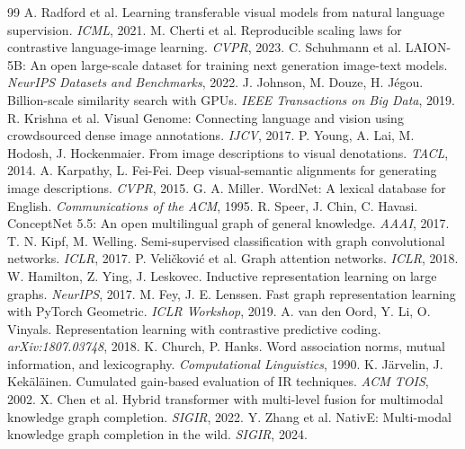 \documentclass[12pt, a4paper]{article}
\begin{document}
\renewcommand{\refname}{Tài liệu tham khảo}
\begin{thebibliography}{99}\small
{} A. Radford et al. Learning transferable visual models from natural language supervision. \textit{ICML}, 2021.
 M. Cherti et al. Reproducible scaling laws for contrastive language-image learning. \textit{CVPR}, 2023.
 C. Schuhmann et al. LAION-5B: An open large-scale dataset for training next generation image-text models. \textit{NeurIPS Datasets and Benchmarks}, 2022.
 J. Johnson, M. Douze, H. Jégou. Billion-scale similarity search with GPUs. \textit{IEEE Transactions on Big Data}, 2019.
 R. Krishna et al. Visual Genome: Connecting language and vision using crowdsourced dense image annotations. \textit{IJCV}, 2017.
 P. Young, A. Lai, M. Hodosh, J. Hockenmaier. From image descriptions to visual denotations. \textit{TACL}, 2014.
 A. Karpathy, L. Fei-Fei. Deep visual-semantic alignments for generating image descriptions. \textit{CVPR}, 2015.
 G. A. Miller. WordNet: A lexical database for English. \textit{Communications of the ACM}, 1995.
 R. Speer, J. Chin, C. Havasi. ConceptNet 5.5: An open multilingual graph of general knowledge. \textit{AAAI}, 2017.
 T. N. Kipf, M. Welling. Semi-supervised classification with graph convolutional networks. \textit{ICLR}, 2017.
 P. Veličković et al. Graph attention networks. \textit{ICLR}, 2018.
 W. Hamilton, Z. Ying, J. Leskovec. Inductive representation learning on large graphs. \textit{NeurIPS}, 2017.
 M. Fey, J. E. Lenssen. Fast graph representation learning with PyTorch Geometric. \textit{ICLR Workshop}, 2019.
 A. van den Oord, Y. Li, O. Vinyals. Representation learning with contrastive predictive coding. \textit{arXiv:1807.03748}, 2018.
 K. Church, P. Hanks. Word association norms, mutual information, and lexicography. \textit{Computational Linguistics}, 1990.
 K. Järvelin, J. Kekäläinen. Cumulated gain-based evaluation of IR techniques. \textit{ACM TOIS}, 2002.
 X. Chen et al. Hybrid transformer with multi-level fusion for multimodal knowledge graph completion. \textit{SIGIR}, 2022.
 Y. Zhang et al. NativE: Multi-modal knowledge graph completion in the wild. \textit{SIGIR}, 2024.

\end{thebibliography}
\end{document}
